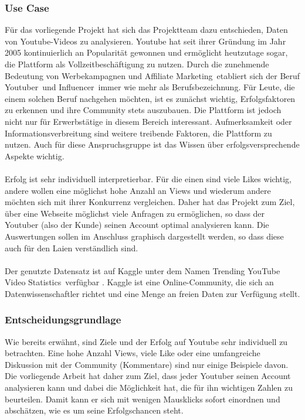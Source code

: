 \documentclass[12pt,titlepage]{article}
\begin{document}
\subsubsection{Use Case}
Für das vorliegende Projekt hat sich das Projektteam dazu entschieden, Daten von Youtube-Videos zu analysieren. Youtube hat seit ihrer Gründung im Jahr 2005 kontinuierlich an Popularität gewonnen und ermöglicht heutzutage sogar, die Plattform als Vollzeitbeschäftigung zu nutzen. Durch die zunehmende Bedeutung von Werbekampagnen und \glqq Affiliate Marketing\grqq\, etabliert sich der Beruf \glqq Youtuber\grqq\, und \glqq Influencer\grqq\, immer wie mehr als Berufsbezeichnung. Für Leute, die einem solchen Beruf nachgehen möchten, ist es zunächst wichtig, Erfolgsfaktoren zu erkennen und ihre Community stets auszubauen. Die Plattform ist jedoch nicht nur für Erwerbstätige in diesem Bereich interessant. Aufmerksamkeit oder Informationsverbreitung sind weitere treibende Faktoren, die Plattform zu nutzen. Auch für diese Anspruchsgruppe ist das Wissen über erfolgsversprechende Aspekte wichtig.\\
\\
Erfolg ist sehr individuell interpretierbar. Für die einen sind viele Likes wichtig, andere wollen eine möglichst hohe Anzahl an Views und wiederum andere möchten sich mit ihrer Konkurrenz vergleichen. Daher hat das Projekt zum Ziel, über eine Webseite möglichst viele Anfragen zu ermöglichen, so dass der Youtuber (also der Kunde) seinen Account optimal analysieren kann. Die Auswertungen sollen im Anschluss graphisch dargestellt werden, so dass diese auch für den Laien verständlich sind.\\
\\
Der genutzte Datensatz ist auf Kaggle unter dem Namen \glqq Trending YouTube Video Statistics\grqq\, verfügbar . Kaggle ist eine Online-Community, die sich an Datenwissenschaftler richtet und eine Menge an freien Daten zur Verfügung stellt.

\subsubsection{Entscheidungsgrundlage}
Wie bereits erwähnt, sind Ziele und der Erfolg auf Youtube sehr individuell zu betrachten. Eine hohe Anzahl Views, viele Like oder eine umfangreiche Diskussion mit der Community (Kommentare) sind nur einige Beispiele davon. Die vorliegende Arbeit hat daher zum Ziel, dass jeder Youtuber seinen Account analysieren kann und dabei die Möglichkeit hat, die für ihn wichtigen Zahlen zu beurteilen. Damit kann er sich mit wenigen Mausklicks sofort einordnen und abschätzen, wie es um seine Erfolgschancen steht. 
\end{document}
